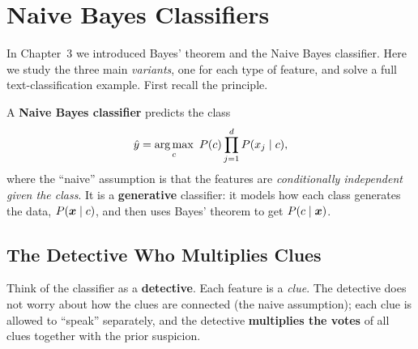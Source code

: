 \section{Naive Bayes Classifiers}

In Chapter~3 we introduced Bayes' theorem and the Naive Bayes classifier. Here we study the three main \emph{variants}, one for each type of feature, and solve a full text-classification example. First recall the principle.

\begin{definition}
A \textbf{Naive Bayes classifier} predicts the class
\[
  \hat y=\operatorname*{arg\,max}_{c}\ P(c)\prod_{j=1}^{d}P(x_j\mid c),
\]
where the ``naive'' assumption is that the features are \emph{conditionally independent given the class}. It is a \textbf{generative} classifier: it models how each class generates the data, $P(\boldsymbol{x}\mid c)$, and then uses Bayes' theorem to get $P(c\mid\boldsymbol{x})$.
\end{definition}

\subsection{The Detective Who Multiplies Clues}

Think of the classifier as a \textbf{detective}. Each feature is a \emph{clue}. The detective does not worry about how the clues are connected (the naive assumption); each clue is allowed to ``speak'' separately, and the detective \textbf{multiplies the votes} of all clues together with the prior suspicion.

